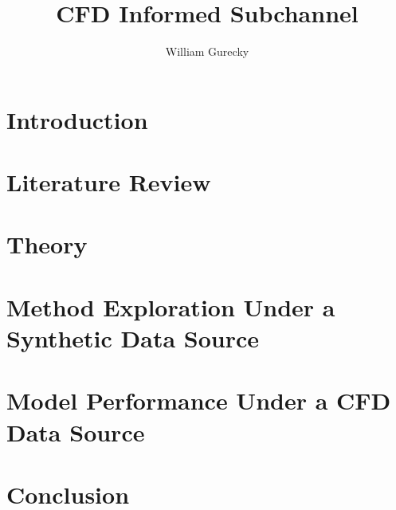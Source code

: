 \documentclass[12pt,a4paper]{report}
\author{William Gurecky}
\title{CFD Informed Subchannel}
\begin{document}








\onehalfspacing
\chapter{Introduction}
\label{chap:intro}


\chapter{Literature Review}
\label{chap:lit}


\chapter{Theory}
\label{chap:theory}


\chapter{Method Exploration Under a Synthetic Data Source}
\label{chap:work}



\chapter{Model Performance Under a CFD Data Source}
\label{chap:fw}


\chapter{Conclusion}
\label{chap:conc}

\end{document}
